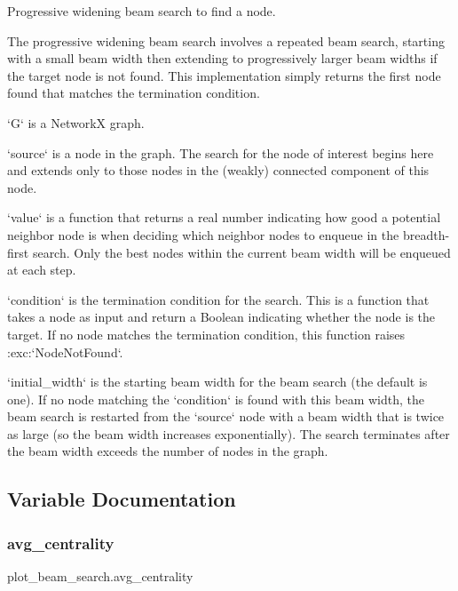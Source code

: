 \begin{DoxyVerb}Progressive widening beam search to find a node.

The progressive widening beam search involves a repeated beam
search, starting with a small beam width then extending to
progressively larger beam widths if the target node is not
found. This implementation simply returns the first node found that
matches the termination condition.

`G` is a NetworkX graph.

`source` is a node in the graph. The search for the node of interest
begins here and extends only to those nodes in the (weakly)
connected component of this node.

`value` is a function that returns a real number indicating how good
a potential neighbor node is when deciding which neighbor nodes to
enqueue in the breadth-first search. Only the best nodes within the
current beam width will be enqueued at each step.

`condition` is the termination condition for the search. This is a
function that takes a node as input and return a Boolean indicating
whether the node is the target. If no node matches the termination
condition, this function raises :exc:`NodeNotFound`.

`initial_width` is the starting beam width for the beam search (the
default is one). If no node matching the `condition` is found with
this beam width, the beam search is restarted from the `source` node
with a beam width that is twice as large (so the beam width
increases exponentially). The search terminates after the beam width
exceeds the number of nodes in the graph.\end{DoxyVerb}
 

\subsection{Variable Documentation}
\mbox{\label{namespaceplot__beam__search_ad7970e9a7d727e860e65a2d5bb8e47a7}} 
\subsubsection{\texorpdfstring{avg\+\_\+centrality}{avg\_centrality}}
{\footnotesize\ttfamily plot\+\_\+beam\+\_\+search.\+avg\+\_\+centrality}

